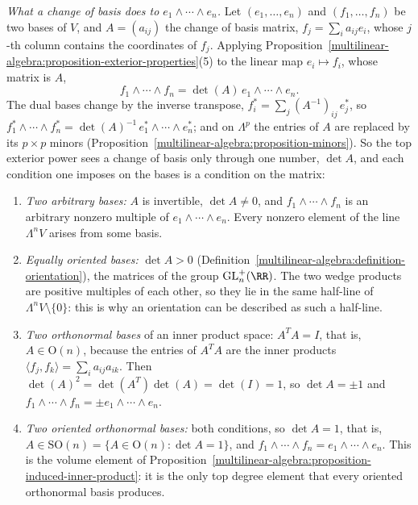\begin{remark}\label{multilinear-algebra:remark-change-of-basis-top}
\emph{What a change of basis does to $e_1 \wedge \cdots \wedge e_n$.} Let $(e_1, \ldots, e_n)$ and $(f_1, \ldots, f_n)$ be two bases of $V$, and $A = (a_{ij})$ the change of basis matrix, $f_j = \sum_ia_{ij}e_i$, whose $j$-th
column contains the coordinates of $f_j$. Applying Proposition~\ref{multilinear-algebra:proposition-exterior-properties}(5) to the linear map $e_i \mapsto f_i$, whose matrix is $A$,
\[
f_1 \wedge \cdots \wedge f_n = \det(A)\,e_1 \wedge \cdots \wedge e_n .
\]
The dual bases change by the inverse transpose, $f^{*}_i = \sum_j(A^{-1})_{ij}\,e^{*}_j$, so $f^{*}_1 \wedge \cdots \wedge f^{*}_n = \det(A)^{-1}\,e^{*}_1 \wedge \cdots \wedge e^{*}_n$; and on $\Lambda^p$ the entries of $A$ are replaced by its
$p \times p$ minors (Proposition~\ref{multilinear-algebra:proposition-minors}). So the top exterior power sees a change of basis only through one number, $\det A$, and each condition one imposes on the bases is a
condition on the matrix:
\begin{enumerate}
\item \emph{Two arbitrary bases:} $A$ is invertible, $\det A \neq 0$, and $f_1 \wedge \cdots \wedge f_n$ is an arbitrary nonzero multiple of $e_1 \wedge \cdots \wedge e_n$. Every nonzero element of the line $\Lambda^nV$ arises from some basis.
\item \emph{Equally oriented bases:} $\det A > 0$ (Definition~\ref{multilinear-algebra:definition-orientation}), the matrices of the group $\mathrm{GL}_n^+(\RR)$. The two wedge products are positive multiples of each other, so they lie in the same
half-line of $\Lambda^nV \setminus \{0\}$: this is why an orientation can be described as such a half-line.
\item \emph{Two orthonormal bases} of an inner product space: $A^TA = I$, that is, $A \in \mathrm{O}(n)$, because the entries of $A^TA$ are the inner products $\langle f_j, f_k\rangle = \sum_ia_{ij}a_{ik}$. Then
$\det(A)^2 = \det(A^T)\det(A) = \det(I) = 1$, so $\det A = \pm1$ and $f_1 \wedge \cdots \wedge f_n = \pm e_1 \wedge \cdots \wedge e_n$.
\item \emph{Two oriented orthonormal bases:} both conditions, so $\det A = 1$, that is, $A \in \mathrm{SO}(n) = \{A \in \mathrm{O}(n) : \det A = 1\}$, and $f_1 \wedge \cdots \wedge f_n = e_1 \wedge \cdots \wedge e_n$. This is the
volume element of Proposition~\ref{multilinear-algebra:proposition-induced-inner-product}: it is the only top degree element that every oriented orthonormal basis produces.

\end{enumerate}
\end{remark}
